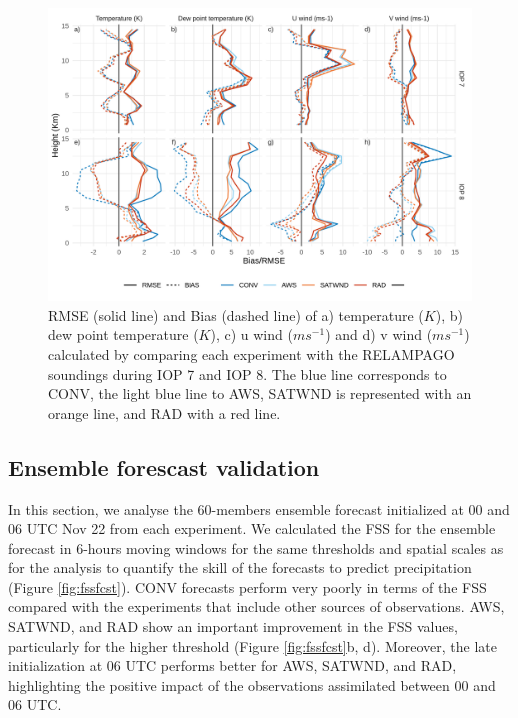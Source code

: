 \documentclass[final,5p,times,twocolumn,authoryear]{elsarticle} %
\begin{document}
\begin{figure}[t]

{\centering \includegraphics{../figures/soundings-1} 

}

\caption{RMSE (solid line) and Bias (dashed line) of a) temperature (\(K\)), b) dew point temperature (\(K\)), c) u wind (\(ms^{-1}\)) and d) v wind (\(ms^{-1}\)) calculated by comparing each experiment with the RELAMPAGO soundings during IOP 7 and IOP 8. The blue line corresponds to CONV, the light blue line to AWS, SATWND is represented with an orange line, and RAD with a red line.}\label{fig:soundings}
\end{figure}

\hypertarget{ensemble-forescast-validation}{%
\subsection{Ensemble forescast validation}\label{ensemble-forescast-validation}}

In this section, we analyse the 60-members ensemble forecast initialized at 00 and 06 UTC Nov 22 from each experiment. We calculated the FSS for the ensemble forecast in 6-hours moving windows for the same thresholds and spatial scales as for the analysis to quantify the skill of the forecasts to predict precipitation (Figure \ref{fig:fssfcst}). CONV forecasts perform very poorly in terms of the FSS compared with the experiments that include other sources of observations. AWS, SATWND, and RAD show an important improvement in the FSS values, particularly for the higher threshold (Figure \ref{fig:fssfcst}b, d). Moreover, the late initialization at 06 UTC performs better for AWS, SATWND, and RAD, highlighting the positive impact of the observations assimilated between 00 and 06 UTC.
\end{document}
